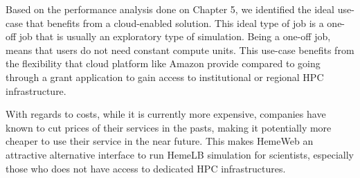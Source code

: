 Based on the performance analysis done on Chapter 5, we identified the ideal use-case that benefits from a cloud-enabled solution. This ideal type of job is a one-off job that is usually an exploratory type of simulation. Being a one-off job, means that users do not need constant compute units. This use-case benefits from the flexibility that cloud platform like Amazon provide compared to going through a grant application to gain access to institutional or regional HPC infrastructure.

With regards to costs, while it is currently more expensive, companies have known to cut prices of their services in the pasts\citep{AWSPr74:online, Annou90:online, Googl18:online}, making it potentially more cheaper to use their service in the near future. This makes HemeWeb an attractive alternative interface to run HemeLB simulation for scientists, especially those who does not have access to dedicated HPC infrastructures. 








